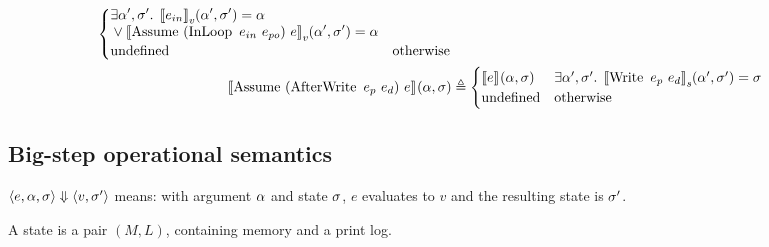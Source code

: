 \begin{align*}
\begin{cases}
\begin{aligned}
      &\exists \targ', \tmem' . \; \denotefv{e_{in}}{\targ',\tmem'} = \targ\\
      &\lor \denotefv{\bop{Assume}{(\bop{InLoop}{e_{in}}{e_{po}})}{e}}{\targ',\tmem'} = \targ
    \end{aligned}
    \\
  \mathrm{undefined} & \text{otherwise}
\end{cases}\\
%
\denotef{\bop{Assume}{(\bop{AfterWrite}{e_p}{e_d})}{e}}{\targ,\tmem} &\eqdef
\begin{cases}
  \denotef{e}{\targ,\tmem} & \exists \targ', \tmem' . \; \denotefs{\bop{Write}{e_p}{e_d}}{\targ',\tmem'} = \tmem \\
  \mathrm{undefined} & \text{otherwise}
\end{cases}\\
\end{align*}


\newpage

\subsection*{Big-step operational semantics}

$\langle e, \alpha, \sigma \rangle \Downarrow \langle v, \sigma' \rangle$ means: with argument $\alpha$ and state $\sigma$, $e$ evaluates to $v$ and the resulting state is $\sigma'$.

A state is a pair $(M, L)$, containing memory and a print log.


